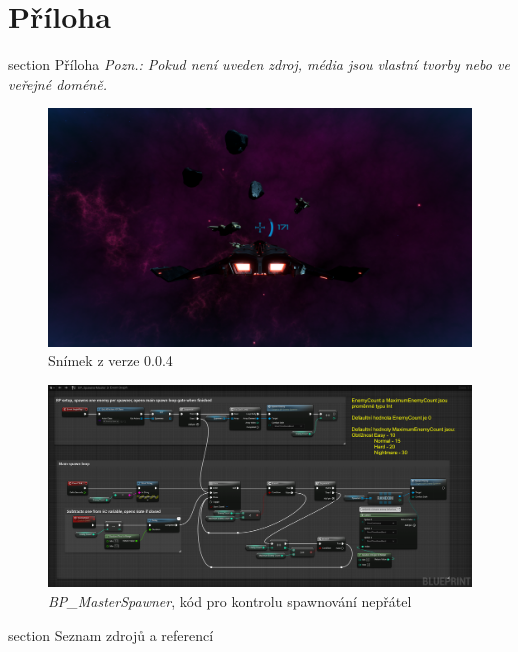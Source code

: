 \documentclass[12pt,a4paper,hidelinks]{article}
\begin{document}
\clearpage

\section*{Příloha}
 {section} {Příloha}
\textit{Pozn.: Pokud není uveden zdroj, média jsou vlastní tvorby nebo ve veřejné doméně.}

\begin{figure}[h!]
	\centering
	\includegraphics[width=1.0\textwidth]{images/astra004_gameplay.png}
	\caption{Snímek z verze 0.0.4}
\end{figure}
\clearpage

\begin{figure}[h!]
	\centering
	\includegraphics[width=1.0\textwidth]{images/masterspawner.png}
	\caption{\textit{BP{\_}MasterSpawner}, kód pro kontrolu spawnování nepřátel}
	\label{masterspawner}
\end{figure}
\clearpage


\printbibliography[title={Seznam zdrojů a referencí}]
 {section} {Seznam zdrojů a referencí}
\end{document}
